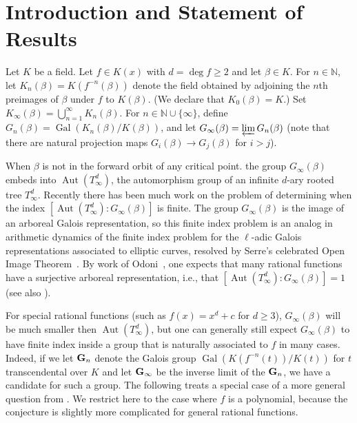 \documentclass[11pt]{amsart}
\theoremstyle{definition}
\theoremstyle{definition}
\numberwithin{thm}{section}
\numberwithin{equation}{thm}
\newcommand{\N}{\ensuremath{{\mathbb{N}}}}
\newcommand{\lra}{\longrightarrow}
\DeclareMathOperator{\Gal}{Gal}
\DeclareMathOperator{\Aut}{Aut}
\begin{document}
\maketitle



\section{Introduction and Statement of Results}\label{intro}
Let $K$ be a field.  Let $f\in K(x)$ with $d=\deg f\geq 2$ and let
$\beta\in K$.  For $n\in\N$, let
$K_n(\beta)=K(f^{-n}(\beta))$ denote the field obtained by adjoining the
$n$th preimages of $\beta$ under $f$ to $K(\beta)$. (We declare that
$K_0(\beta)=K$.)  Set
$K_\infty(\beta)=\bigcup_{n=1}^\infty K_n(\beta)$.  For
$n\in\N\cup\{\infty\}$, define
$G_n(\beta)=\Gal(K_n(\beta)/K(\beta))$, and let $G_\infty(\beta) =
\varprojlim G_n (\beta)$ (note that there are natural projection maps $G_i (\beta)
\lra G_j (\beta)$ for $i  > j$).  

When $\beta$ is not in the forward orbit of any critical point.  the
group $G_\infty(\beta)$ embeds into $\Aut(T^d_\infty)$, the
automorphism group of an infinite $d$-ary rooted tree
$T^d_\infty$. Recently there has been much work on the problem of
determining when the index $[\Aut(T^d_\infty):G_\infty(\beta)]$ is
finite. The group $G_\infty(\beta)$ is the image of an arboreal Galois
representation, so this finite index problem is an analog in
arithmetic dynamics of the finite index problem for the $\ell$-adic
Galois representations associated to elliptic curves, resolved by
Serre's celebrated Open Image Theorem~\cite{Serre}. By work of
Odoni~\cite{OdoniIterates}, one expects that many rational functions
have a surjective arboreal representation, i.e., that
$[\Aut(T^d_\infty):G_\infty(\beta)]=1$ (see also \cite{OC, NL,
  Kadets, False, RafeS}).  

For special rational functions (such as $f(x) = x^d + c$ for
$d \geq 3$), $G_\infty(\beta)$ will be much smaller then
$\Aut(T^d_\infty)$, but one can generally still expect
$G_\infty(\beta)$ to have finite index inside a group that is
naturally associated to $f$ in many cases.  Indeed, if we let ${\bf
  G}_n$ denote the Galois group $\Gal(K(f^{-n}(t)) / K(t))$ for $t$
transcendental over $K$ and let ${\bf G}_\infty$ be the inverse limit
of the ${\bf G}_n$, we have a candidate for such a group.  The
following treats a special case of a more general question from
\cite{Conjecture}. We restrict here to the case where $f$ is a
polynomial, because the conjecture is slightly more complicated for
general rational functions.  
\end{document}
